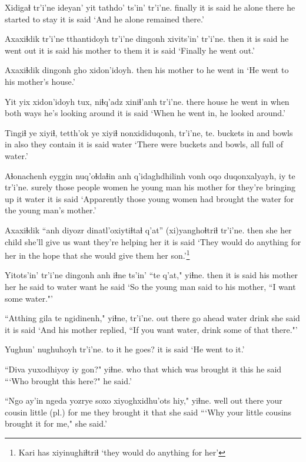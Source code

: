 \documentclass[12pt]{article}
\begin{document}
\gll Xidigaɬ tr'i'ne ideyan' yit tathdo' ts'in' tr'i'ne.
finally  {it is said} {he alone} there {he started to stay} {}  {it is said}
\glt `And he alone remained there.'
\glend

\gll Axaxiɬdik tr'i'ne tthantidoyh tr'i'ne dingonh xivits'in' tr'i'ne.
then  {it is said} {he went out} {it is said} {his mother} {to them} {it is said}
\glt `Finally he went out.'
\glend

\gll Axaxiɬdik dingonh gho  xidon'idoyh.
then  {his mother} to  {he went in}
\glt `He went to his mother's house.'
\glend

\gll Yit yix xidon'idoyh tux, niɬq'adz xiniɬ'anh tr'i'ne.
there house {he went in} when {both ways} {he's looking around} {it is said}
\glt `When he went in, he looked around.'
\glend

\gll Tingiɬ ye xiyiɬ, tetth'ok ye xiyiɬ nonxididuqonh, tr'i'ne, te.
buckets in and bowls in also {they contain} {it is said} water
\glt `There were buckets and bowls, all full of water.'
\glend

\gll Aɬonachenh eyggin nuq'oɬdaɬin anh q'idaghdhilinh vonh oqo duqonxalyayh, iy te tr'i'ne.
surely {those people} women  he {young man} {his mother} for {they're bringing up} it water {it is said}
\glt `Apparently those young women had brought the water for the young man's mother.'
\glend

\gll Axaxiɬdik ``anh diyozr dinatl'oxiytiɬtaɬ q'at'' (xi)yanghoɬtriɬ   tr'i'ne.
then  she {her child} {she'll give us} want {they're helping her} {it is said}
\glt `They would do anything for her in the hope that she would give them her son.'\footnote{Kari has xiyinughiɬtriɬ `they would do anything for her'}
\glend

\gll Yitots'in' tr'i'ne dingonh anh iɬne ts'in' ``te q'at," yiɬne.
then  {it is said} {his mother} her {he said} to water want  {he said}
\glt `So the young man said to his mother, ``I want some water."'
\glend

\gll ``Atthing gila te ngidinenh,"  yiɬne,  tr'i'ne.
{out there} {go ahead} water drink {she said}  {it is said}
\glt `And his mother replied, ``If you want water, drink some of that there."'
\glend

\gll Yughun' nughuhoyh  tr'i'ne.
{to it} {he goes?} {it is said}
\glt `He went to it.'
\glend

\gll ``Diva  yuxodhiyoy iy gon?" yiɬne.
who  {that which was brought} it this {he said}
\glt ```Who brought this here?" he said.'
\glend

\gll ``Ngo ay'in ngeda yozrye soxo xiyoghxidhu'ots hiy," yiɬne.
well {out there} {your cousin} {little (pl.)} {for me} {they brought it} that {she said}
\glt ```Why your little cousins brought it for me," she said.'
\glend
\end{document}
